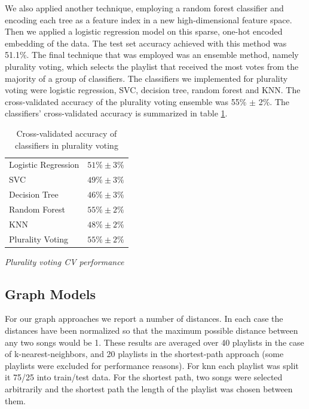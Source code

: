 \documentclass[acmtog]{acmart}
\begin{document}
We also applied another technique, employing a random forest classifier and encoding each tree as a feature index in a new high-dimensional feature space. Then we applied a logistic regression model on this sparse, one-hot encoded embedding of the data. The test set accuracy achieved with this method was 51.1\%.
The final technique that was employed was an ensemble method, namely plurality voting, which selects the playlist that received the most votes from the majority of a group of classifiers. The classifiers we implemented for plurality voting were logistic regression, SVC, decision tree, random forest and KNN. The cross-validated accuracy of the plurality voting ensemble was 55\% $\pm$ 2\%. The classifiers' cross-validated accuracy is summarized in table \ref{tab:two}.
\begin{table}%
\caption{Cross-validated accuracy of classifiers in plurality voting}
\label{tab:two}
\begin{minipage}{\columnwidth}
\begin{center}
\begin{tabular}{ll}
  \toprule
  Logistic Regression    & $51\% \pm 3\%$\\
  SVC  & $49\% \pm 3\%$\\
  Decision Tree  & $46\% \pm 3\%$\\
  Random Forest  & $55\% \pm 2\%$\\
  KNN  & $48\% \pm 2\%$\\
  Plurality Voting  & $55\% \pm 2\%$\\
  \bottomrule
\end{tabular}
\end{center}
\bigskip\centering
\footnotesize
 \emph{Plurality voting CV performance}
\end{minipage}
\end{table}%

\subsection{Graph Models}

For our graph approaches we report a number of distances. In each case the distances have been normalized so that the maximum possible distance between any two songs would be 1. These results are averaged over
40 playlists in the case of k-nearest-neighbors, and 20 playlists in the shortest-path approach (some playlists were excluded for performance reasons). For knn each playlist was split it 75/25 into train/test data. For the shortest path, two songs were selected arbitrarily and the shortest path the length of the playlist was chosen between them.
\end{document}
